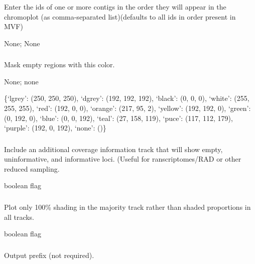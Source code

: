 \documentclass[letterpaper,11pt,english]{sphinxmanual}
\begin{document}
\subsubsection{}
\label{\detokenize{prog_desc:id141}}
 Enter the ids of one or more contigs in the order they will appear in the chromoplot (as comma-separated list)(defaults to all ids in order present in MVF)

 None;  None


\subsubsection{}
\label{\detokenize{prog_desc:empty-mask-emptymask}}
 Mask empty regions with this color.

 None;  none

 \{‘lgrey’: (250, 250, 250), ‘dgrey’: (192, 192, 192), ‘black’: (0, 0, 0), ‘white’: (255, 255, 255), ‘red’: (192, 0, 0), ‘orange’: (217, 95, 2), ‘yellow’: (192, 192, 0), ‘green’: (0, 192, 0), ‘blue’: (0, 0, 192), ‘teal’: (27, 158, 119), ‘puce’: (117, 112, 179), ‘purple’: (192, 0, 192), ‘none’: ()\}


\subsubsection{}
\label{\detokenize{prog_desc:info-track-infotrack}}
 Include an additional coverage information track that will show empty, uninformative, and informative loci. (Useful for ranscriptomes/RAD or other reduced sampling.

 boolean flag


\subsubsection{}
\label{\detokenize{prog_desc:majority}}
 Plot only 100\% shading in the majority track  rather than shaded proportions in all tracks.

 boolean flag


\subsubsection{}
\label{\detokenize{prog_desc:out-prefix-outprefix}}
 Output prefix (not required).
\end{document}
